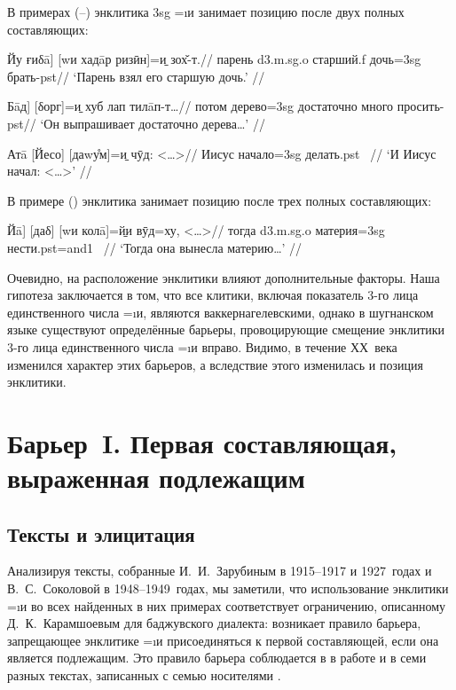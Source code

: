 В примерах (–) энклитика {\sc 3sg} =\i{и} занимает позицию после двух полных составляющих:

\begingl
\gla {[}Йу ғиδā{]} {[}wи хадāр ризӣн{]}=\b{и} зох̌-т.//
 парень {\sc d3.m.sg.o} старший.{\sc f} дочь={\sc 3sg} брать-{\sc pst}//
\glft ‘Парень взял его старшую дочь.’ //
\endgl \xe

\begingl
\gla {[}Бāд{]} {[}δорг{]}=\b{и} хуб лап тилāп-т…//
\glc потом дерево={\sc 3sg} достаточно много просить-{\sc pst}//
\glft ‘Он выпрашивает достаточно дерева…’ //
\endgl \xe

\begingl
\gla Атā {[}Йесо{]} {[}даwу̊м{]}=\b{и} чӯд: <…>//
 Иисус начало={\sc 3sg} делать.{\sc pst} ~//
\glft ‘И Иисус начал: <…>’ //
\endgl \xe

В примере () энклитика занимает позицию после трех полных составляющих:

\begingl
\gla {[}Йā{]} {[}даδ{]} {[}wи колā{]}=\b{йи} вӯд=ху, <…>//
 тогда {\sc d3.m.sg.o} материя={\sc 3sg} нести.{\sc pst=and1} ~//
\glft ‘Тогда она вынесла материю…’ //
\endgl \xe

Очевидно, на расположение энклитики влияют дополнительные факторы. Наша гипотеза заключается в том, что все клитики, включая показатель 3-го лица единственного числа =\i{и}, являются ваккернагелевскими, однако в шугнанском языке существуют определённые барьеры, провоцирующие смещение энклитики 3-го лица единственного числа =\i{и} вправо. Видимо, в течение ХХ~века изменился характер этих барьеров, а вследствие этого изменилась и позиция энклитики.

\section{Барьер~I. Первая составляющая, выраженная подлежащим} \label{clit-barone}

\subsection{Тексты и элицитация} \label{clit-barone-texts}

Анализируя тексты, собранные И.~И.~Зарубиным в 1915–1917 и 1927~годах и В.~С.~Соколовой в 1948–1949~годах, мы заметили, что использование энклитики =\i{и} во всех найденных в них примерах соответствует ограничению, описанному Д.~К.~Карамшоевым для баджувского диалекта: возникает правило барьера, запрещающее энклитике =\i{и} присоединяться к первой составляющей, если она является подлежащим. Это правило барьера соблюдается в в работе \parencite{pakhalina1969_pamir} и в семи разных текстах, записанных с семью носителями \parencite{zarubin1960}.

